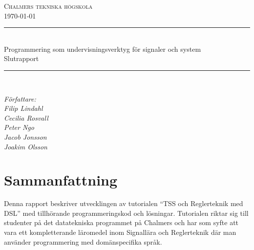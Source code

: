 \documentclass[]{article}
\date{\today}
\begin{document}
\renewcommand*\abstractname{Sammandrag}

\begin{titlepage} \newcommand{\HRule}{\rule{\linewidth}{0.3mm}}
\center
\textsc{\Large Chalmers tekniska högskola}\\[0.05cm]
\normalsize \today

\HRule \\[0.08cm]
{\large  Programmering som undervisningsverktyg för signaler och system \\ \normalsize{Slutrapport}}\\[0.08cm] %
\HRule \\[0.3cm]

\vfill

\begin{flushleft} \small
    \emph{Författare: \\
    \quad Filip Lindahl\\
    \quad Cecilia Rosvall\\
    \quad Peter Ngo\\
    \quad Jacob Jonsson\\
    \quad Joakim Olsson\\}
\end{flushleft}
\end{titlepage}
\newpage

\begin{abstract}
\end{abstract}
\newpage



\newpage
\tableofcontents

\newpage

\setlength{\parskip}{2mm}
\setlength{\parindent}{0pt}


\section{Sammanfattning}

Denna rapport beskriver utvecklingen av tutorialen “TSS och Reglerteknik med DSL” med tillhörande programmeringskod och lösningar. Tutorialen riktar sig till studenter på det datatekniska programmet på Chalmers och har som syfte att vara ett kompletterande läromedel inom Signallära och Reglerteknik där man använder programmering med domänspecifika språk.
\end{document}
